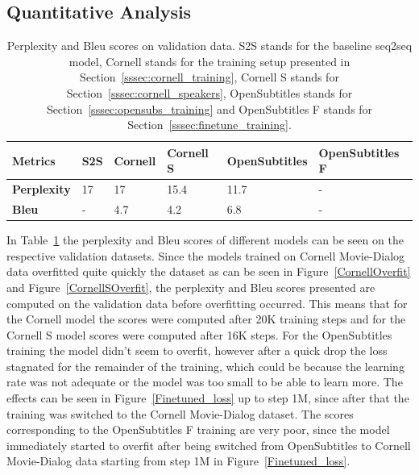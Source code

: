 \documentclass[12pt]{article}
\begin{document}
\subsection{Quantitative Analysis} \label{ssec:51}
\begin{table}[H]
	\centering
	\begin{tabular}{|l|l|l|l|l|l|}
		\hline
		\textbf{Metrics} & \textbf{S2S} & \textbf{Cornell} & \textbf{Cornell S} & \textbf{OpenSubtitles} & \textbf{OpenSubtitles F}\\ \hline
		\textbf{Perplexity} & 17 & 17 & 15.4 & 11.7 & -
		\\ \hline
		\textbf{Bleu} & - & 4.7 & 4.2 & 6.8 & -
		\\ \hline
	\end{tabular}
	\caption{Perplexity and Bleu scores on validation data. S2S stands for the baseline seq2seq model, Cornell stands for the training setup presented in Section~\ref{sssec:cornell_training}, Cornell S stands for Section~\ref{sssec:cornell_speakers}, OpenSubtitles stands for Section~\ref{sssec:opensubs_training} and OpenSubtitles F stands for Section~\ref{sssec:finetune_training}.}	
	\label{table:scores}
\end{table}

In Table~\ref{table:scores} the perplexity and Bleu scores of different models can be seen on the respective validation datasets. Since the models trained on Cornell Movie-Dialog data overfitted quite quickly the dataset as can be seen in Figure~\ref{CornellOverfit} and Figure~\ref{CornellSOverfit}, the perplexity and Bleu scores presented are computed on the validation data before overfitting occurred. This means that for the Cornell model the scores were computed after 20K training steps and for the Cornell S model scores were computed after 16K steps. For the OpenSubtitles training the model didn't seem to overfit, however after a quick drop the loss stagnated for the remainder of the training, which could be because the learning rate was not adequate or the model was too small to be able to learn more. The effects can be seen in Figure~\ref{Finetuned_loss} up to step 1M, since after that the training was switched to the Cornell Movie-Dialog dataset. The scores corresponding to the OpenSubtitles F training are very poor, since the model immediately started to overfit after being switched from OpenSubtitles to Cornell Movie-Dialog data starting from step 1M in Figure~\ref{Finetuned_loss}.
\end{document}
